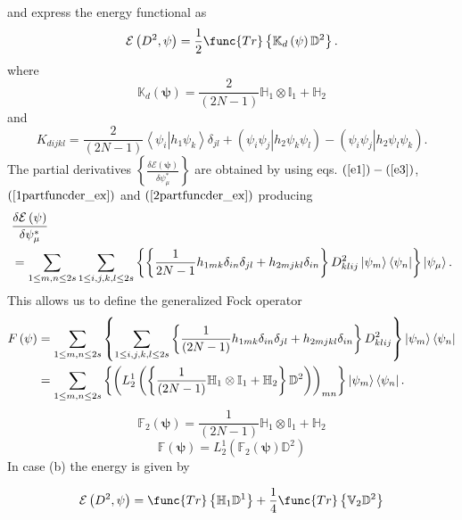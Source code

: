 \documentclass[aps,preprint]{revtex4}
\begin{document}
and express the energy functional as 
\begin{equation}
\mathcal{E}\left( D^{2},\mathbf{\psi }\right) =\frac{1}{2}\func{Tr}\left\{ 
\mathbb{K}_{d}\left( \mathbf{\psi }\right) \mathbb{D}^{2}\right\} .
\label{RDO_en1}
\end{equation}%
where%
\begin{equation}
\mathbb{K}_{d}\left( \mathbf{\psi }\right) =\frac{2}{\left( 2N-1\right) }%
\mathbb{H}_{1}\otimes \mathbb{I}_{1}+\mathbb{H}_{2}  \label{e2}
\end{equation}%
and 
\begin{equation}
K_{dijkl}=\frac{2}{\left( 2N-1\right) }\left\langle \left. \psi
_{i}\right\vert h_{1}\psi _{k}\right\rangle \delta _{jl}+\left( \left. \psi
_{i}\psi _{j}\right\vert h_{2}\psi _{k}\psi _{l}\right) -\left( \left. \psi
_{i}\psi _{j}\right\vert h_{2}\psi _{l}\psi _{k}\right) .  \label{e3}
\end{equation}%
The partial derivatives $\left\{ \frac{\delta \mathcal{E}\left( \mathbf{\psi 
}\right) }{\delta \psi _{\mu }^{\ast }}\right\} $ are obtained by using eqs. 
$\left( \ref{e1}\right) -\left( \ref{e3}\right) $, $\left( \ref%
{1partfuncder_ex}\right) $ and $\left( \ref{2partfuncder_ex}\right) $
producing 
\begin{align}
& \frac{\delta \mathcal{E}\left( \mathbf{\psi }\right) }{\delta \psi _{\mu
}^{\ast }}  \notag \\
& \left. =\right. \sum_{1\leq m,n\leq 2s}\sum_{1\leq i,j,k,l\leq 2s}\left\{
\left\{ \frac{1}{2N-1}h_{1mk}\delta _{in}\delta _{jl}+h_{2mjkl}\delta
_{in}\right\} \overset{}{D_{klij}^{2}\left\vert \psi _{m}\right\rangle
\left\langle \psi _{n}\right\vert }\right\} \left\vert \psi _{\mu
}\right\rangle .
\end{align}%
This allows us to define the generalized Fock operator
\begin{subequations}
\begin{align}
F\left( \mathbf{\psi }\right) & =\sum_{1\leq m,n\leq 2s}\left\{ \sum_{1\leq
i,j,k,l\leq 2s}\left\{ \frac{1}{\left( 2N-1\right) }h_{1mk}\delta
_{in}\delta _{jl}+h_{2mjkl}\delta _{in}\right\} D_{klij}^{2}\right\}
\left\vert \psi _{m}\right\rangle \left\langle \psi _{n}\right\vert  \\
& =\sum_{1\leq m,n\leq 2s}\left\{ \left( L_{2}^{1}\left( \left\{ \frac{1}{%
\left( 2N-1\right) }\mathbb{H}_{1}\otimes \mathbb{I}_{1}+\mathbb{H}%
_{2}\right\} \mathbb{D}^{2}\right) \right) _{mn}\right\} \left\vert \psi
_{m}\right\rangle \left\langle \psi _{n}\right\vert .
\end{align}%
\end{subequations}
\begin{equation}
\mathbb{F}_{2}\left( \mathbf{\psi }\right) =\frac{1}{\left( 2N-1\right) }%
\mathbb{H}_{1}\otimes \mathbb{I}_{1}+\mathbb{H}_{2}
\end{equation}%
\begin{equation}
\mathbb{F}\left( \mathbf{\psi }\right) =L_{2}^{1}\left( \mathbb{F}_{2}\left( 
\mathbf{\psi }\right) \mathbb{D}^{2}\right) 
\end{equation}%
In case (b) the energy is given by 

\begin{equation}
\mathcal{E}\left( D^{2},\mathbf{\psi }\right) =\func{Tr}\left\{ \mathbb{H}%
_{1}\mathbb{D}^{1}\right\} +\frac{1}{4}\func{Tr}\left\{ \mathbb{V}_{2}%
\mathbb{D}^{2}\right\} 
\end{equation}
\end{document}
